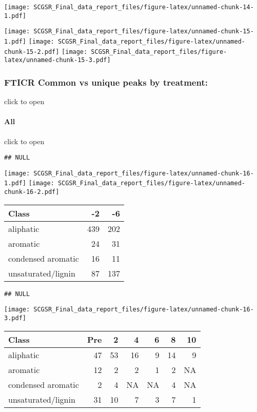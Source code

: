 \documentclass[
]{article}
\begin{document}
\texttt{[image: SCGSR\_Final\_data\_report\_files/figure-latex/unnamed-chunk-14-1.pdf]}

\texttt{[image: SCGSR\_Final\_data\_report\_files/figure-latex/unnamed-chunk-15-1.pdf]}
\texttt{[image: SCGSR\_Final\_data\_report\_files/figure-latex/unnamed-chunk-15-2.pdf]}
\texttt{[image: SCGSR\_Final\_data\_report\_files/figure-latex/unnamed-chunk-15-3.pdf]}

\hypertarget{fticr-common-vs-unique-peaks-by-treatment}{%
\subsubsection{FTICR Common vs unique peaks by
treatment:}\label{fticr-common-vs-unique-peaks-by-treatment}}

click to open

\hypertarget{all}{%
\paragraph{All}\label{all}}

click to open

\begin{verbatim}
## NULL
\end{verbatim}

\texttt{[image: SCGSR\_Final\_data\_report\_files/figure-latex/unnamed-chunk-16-1.pdf]}
\texttt{[image: SCGSR\_Final\_data\_report\_files/figure-latex/unnamed-chunk-16-2.pdf]}

\begin{longtable}[]{@{}lrr@{}}
\toprule()
Class & -2 & -6 \\
\midrule()
\endhead
aliphatic & 439 & 202 \\
aromatic & 24 & 31 \\
condensed aromatic & 16 & 11 \\
unsaturated/lignin & 87 & 137 \\
\bottomrule()
\end{longtable}

\begin{verbatim}
## NULL
\end{verbatim}

\texttt{[image: SCGSR\_Final\_data\_report\_files/figure-latex/unnamed-chunk-16-3.pdf]}

\begin{longtable}[]{@{}lrrrrrr@{}}
\toprule()
Class & Pre & 2 & 4 & 6 & 8 & 10 \\
\midrule()
\endhead
aliphatic & 47 & 53 & 16 & 9 & 14 & 9 \\
aromatic & 12 & 2 & 2 & 1 & 2 & NA \\
condensed aromatic & 2 & 4 & NA & NA & 4 & NA \\
unsaturated/lignin & 31 & 10 & 7 & 3 & 7 & 1 \\
\bottomrule()
\end{longtable}
\end{document}
